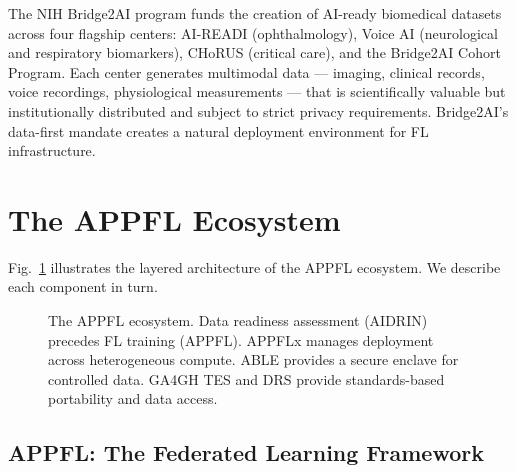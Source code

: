 \documentclass[conference]{IEEEtran}
\begin{document}
The NIH Bridge2AI program funds the creation of AI-ready biomedical datasets across four flagship centers: AI-READI (ophthalmology), Voice AI (neurological and respiratory biomarkers), CHoRUS (critical care), and the Bridge2AI Cohort Program. Each center generates multimodal data — imaging, clinical records, voice recordings, physiological measurements — that is scientifically valuable but institutionally distributed and subject to strict privacy requirements. Bridge2AI's data-first mandate creates a natural deployment environment for FL infrastructure.

\section{The APPFL Ecosystem}

Fig.~\ref{fig:architecture} illustrates the layered architecture of the APPFL ecosystem. We describe each component in turn.

\begin{figure}[t]
    \centering
    \caption{The APPFL ecosystem. Data readiness assessment (AIDRIN) precedes FL training (APPFL). APPFLx manages deployment across heterogeneous compute. ABLE provides a secure enclave for controlled data. GA4GH TES and DRS provide standards-based portability and data access.}
    \label{fig:architecture}
\end{figure}

\subsection{APPFL: The Federated Learning Framework}
\end{document}
